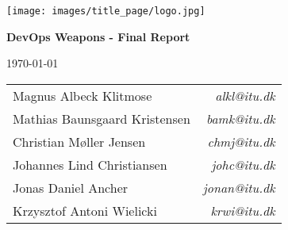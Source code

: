 \begin{titlepage}
    \centering
    \texttt{[image: images/title\_page/logo.jpg]}\\
    \vspace*{\fill}
    {\LARGE \textbf{DevOps Weapons - Final Report} \par}
    \vspace{1cm}
    {\large \today \par}
    \vspace{1cm}
        \begin{table}[h!]
        \centering
        \begin{tabular}{lr}
        Magnus Albeck Klitmose        & \textit{alkl@itu.dk}  \\
        Mathias Baunsgaard Kristensen & \textit{bamk@itu.dk}  \\
        Christian Møller Jensen       & \textit{chmj@itu.dk}  \\
        Johannes Lind Christiansen    & \textit{johc@itu.dk}  \\
        Jonas Daniel Ancher           & \textit{jonan@itu.dk} \\
        Krzysztof Antoni Wielicki     & \textit{krwi@itu.dk}
        \end{tabular}
        \end{table}    
    \vspace*{\fill}
\end{titlepage}

